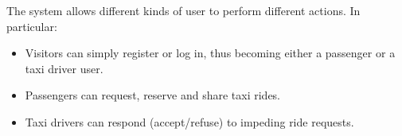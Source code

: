 The system allows different kinds of user to perform different actions. In particular:
\begin{itemize}
  \item Visitors can simply register or log in, thus becoming either a passenger or a taxi driver user.
  \item Passengers can request, reserve and share taxi rides.
  \item Taxi drivers can respond (accept/refuse) to impeding ride requests.
\end{itemize}
